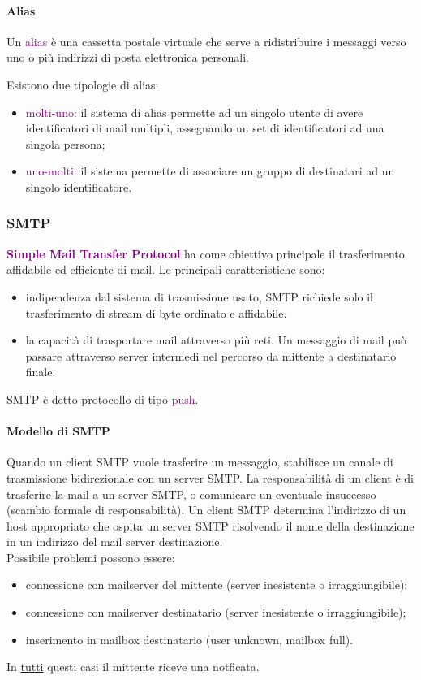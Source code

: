 \paragraph{Alias}
\begin{definition}
    Un \textcolor{purple}{alias} è una cassetta postale virtuale che serve a ridistribuire i messaggi verso uno o più indirizzi di posta elettronica personali.
\end{definition}

Esistono due tipologie di alias:
\begin{itemize}
    \item \textcolor{purple}{molti-uno:} il sistema di alias permette ad un singolo utente di avere identificatori di mail multipli, assegnando un set di identificatori ad una singola persona;
    \item \textcolor{purple}{uno-molti:} il sistema permette di associare un gruppo di destinatari ad un singolo identificatore.
\end{itemize}

\subsubsection{SMTP}
\textbf{\textcolor{purple}{Simple Mail Transfer Protocol}} ha come obiettivo principale il trasferimento affidabile ed efficiente di mail.
Le principali caratteristiche sono:
\begin{itemize}
    \item indipendenza dal sistema di trasmissione usato, SMTP richiede solo il trasferimento di stream di byte ordinato e affidabile.
    \item la capacità di trasportare mail attraverso più reti. Un messaggio di mail può passare attraverso server intermedi nel percorso da mittente a destinatario finale.
\end{itemize}
SMTP è detto protocollo di tipo \textcolor{purple}{push}.

\paragraph{Modello di SMTP}
Quando un client SMTP vuole trasferire un messaggio, stabilisce un canale di trasmissione bidirezionale con un server SMTP. 
La responsabilità di un client è di trasferire la mail a un server SMTP, o comunicare un eventuale insuccesso (scambio formale di responsabilità).
Un client SMTP determina l’indirizzo di un host appropriato che ospita un server SMTP risolvendo il nome della destinazione in un indirizzo del mail server destinazione.
\\Possibile problemi possono essere:
\begin{itemize}
    \item connessione con mailserver del mittente (server inesistente o irraggiungibile);
    \item connessione con mailserver destinatario (server inesistente o irraggiungibile);
    \item inserimento in mailbox destinatario (user unknown, mailbox full).
\end{itemize}
In \underline{tutti} questi casi il mittente riceve una notficata.

